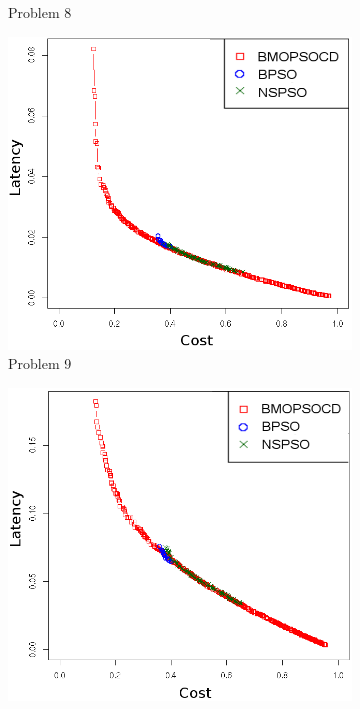 \begin{figure}[]
\begin{subfigure}{0.30\textwidth}
	   \caption{Problem 8}
   \end{subfigure}
      \begin{subfigure}{0.30\textwidth}
       \includegraphics[width=\textwidth]{pics/total9.png}
	   \caption{Problem 9}
   \end{subfigure}
   \begin{subfigure}{0.30\textwidth}
       \includegraphics[width=\textwidth]{pics/total10.png}

\end{subfigure}
\end{figure}
